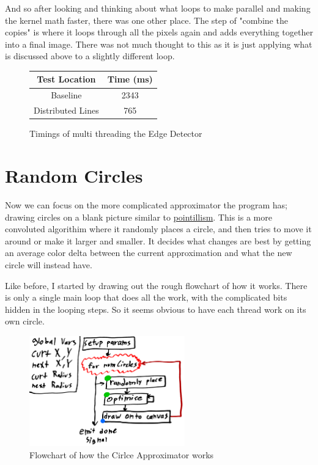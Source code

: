 \documentclass[12pt]{article}
\begin{document}
And so after looking and thinking about what loops to make parallel and making the kernel math faster, there was one other place.
The step of "combine the copies" is where it loops through all the pixels again and adds everything together into a final image.
There was not much thought to this as it is just applying what is discussed above to a slightly different loop.

\begin{figure}[htb]
	\centering
	\begin{tabular}{|c|c|}
		\hline
		Test Location & Time (ms) \\ \hline \hline
		Baseline & 2343 \\ \hline
		Distributed Lines & 765 \\ \hline
	\end{tabular}
	\caption{Timings of multi threading the Edge Detector}
\end{figure}

\newpage
\section{Random Circles}

Now we can focus on the more complicated approximator the program has; drawing circles on a blank picture similar to \href{https://en.wikipedia.org/wiki/Pointillism}{pointillism}.
This is a more convoluted algorithim where it randomly places a circle, and then tries to move it around or make it larger and smaller.
It decides what changes are best by getting an average color delta between the current approximation and what the new circle will instead have.


Like before, I started by drawing out the rough flowchart of how it works.
There is only a single main loop that does all the work, with the complicated bits hidden in the looping steps.
So it seems obvious to have each thread work on its own circle.

\begin{figure}[htb]
	\centering
	\includegraphics[width=0.6\textwidth]{circle_flowchart.png}
	\caption{Flowchart of how the Cirlce Approximator works}
\end{figure}
\end{document}
